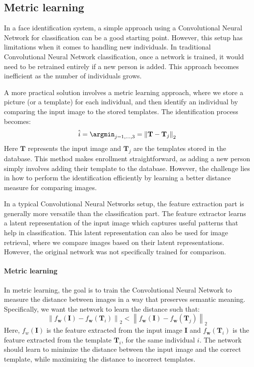 \subsection{Metric learning}
In a face identification system, a simple approach using a Convolutional Neural Network for classification can be a good starting point.
However, this setup has limitations when it comes to handling new individuals. 
In traditional Convolutional Neural Network classification, once a network is trained, it would need to be retrained entirely if a new person is added. This approach becomes inefficient as the number of individuals grows.

A more practical solution involves a metric learning approach, where we store a picture (or a template) for each individual, and then identify an individual by comparing the input image to the stored templates. 
The identification process becomes:
\[\hat{i}=\argmin_{j=1,\dots,3}={\left\lVert \mathbf{T}-\mathbf{T}_j\right\rVert}_2 \]
Here $\mathbf{T}$ represents the input image and $\mathbf{T}_j$ are the templates stored in the database.
This method makes enrollment straightforward, as adding a new person simply involves adding their template to the database. 
However, the challenge lies in how to perform the identification efficiently by learning a better distance measure for comparing images.

In a typical Convolutional Neural Networks setup, the feature extraction part is generally more versatile than the classification part. 
The feature extractor learns a latent representation of the input image which captures useful patterns that help in classification.
This latent representation can also be used for image retrieval, where we compare images based on their latent representations.
However, the original network was not specifically trained for comparison. 

\paragraph*{Metric learning}
In metric learning, the goal is to train the Convolutional Neural Network to measure the distance between images in a way that preserves semantic meaning. 
Specifically, we want the network to learn the distance such that:
\[{\left\lVert f_{\mathbf{w}}(\mathbf{I})-f_{\mathbf{w}}(\mathbf{T}_i)\right\rVert}_2<{\left\lVert f_{\mathbf{w}}(\mathbf{I})-f_{\mathbf{w}}(\mathbf{T}_j)\right\rVert}_2\]
Here, $f_w(\mathbf{I})$ is the feature extracted from the input image $\mathbf{I}$ and $f_{\mathbf{w}}(\mathbf{T}_i)$ is the feature extracted from the template $\mathbf{T}_i$, for the same individual $i$. 
The network should learn to minimize the distance between the input image and the correct template, while maximizing the distance to incorrect templates.

